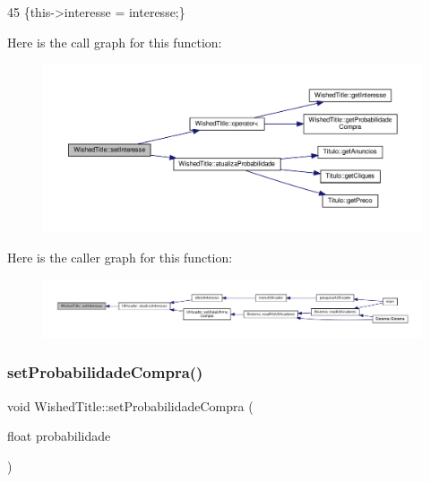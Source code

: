 \begin{DoxyCode}
45 \{this->interesse = interesse;\}
\end{DoxyCode}
Here is the call graph for this function\+:
\nopagebreak
\begin{figure}[H]
\begin{center}
\leavevmode
\includegraphics[width=350pt]{classWishedTitle_ae81814e2837a03f1bcbc1064da0e652e_cgraph}
\end{center}
\end{figure}
Here is the caller graph for this function\+:
\nopagebreak
\begin{figure}[H]
\begin{center}
\leavevmode
\includegraphics[width=350pt]{classWishedTitle_ae81814e2837a03f1bcbc1064da0e652e_icgraph}
\end{center}
\end{figure}
\mbox{\label{classWishedTitle_aacaf6dfce83390dcc78f0ecd679e1de1}} 
\subsubsection{\texorpdfstring{set\+Probabilidade\+Compra()}{setProbabilidadeCompra()}}
{\footnotesize\ttfamily void Wished\+Title\+::set\+Probabilidade\+Compra (\begin{DoxyParamCaption}\item[{float}]{probabilidade }\end{DoxyParamCaption})}



